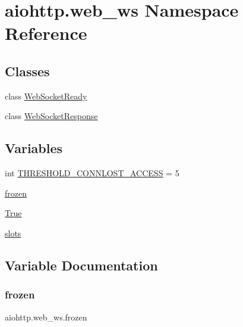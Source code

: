 \hypertarget{namespaceaiohttp_1_1web__ws}{}\section{aiohttp.\+web\+\_\+ws Namespace Reference}
\label{namespaceaiohttp_1_1web__ws}
\subsection*{Classes}
\begin{DoxyCompactItemize}
\item 
class \hyperlink{classaiohttp_1_1web__ws_1_1_web_socket_ready}{Web\+Socket\+Ready}
\item 
class \hyperlink{classaiohttp_1_1web__ws_1_1_web_socket_response}{Web\+Socket\+Response}
\end{DoxyCompactItemize}
\subsection*{Variables}
\begin{DoxyCompactItemize}
\item 
int \hyperlink{namespaceaiohttp_1_1web__ws_a301c60ec5ef2ebeaf60dfb153953cd4a}{T\+H\+R\+E\+S\+H\+O\+L\+D\+\_\+\+C\+O\+N\+N\+L\+O\+S\+T\+\_\+\+A\+C\+C\+E\+SS} = 5
\item 
\hyperlink{namespaceaiohttp_1_1web__ws_af1dc0f64cc8b48d311c7ec0ac25519d3}{frozen}
\item 
\hyperlink{namespaceaiohttp_1_1web__ws_ac7829506fa569276f8dff27ec629271b}{True}
\item 
\hyperlink{namespaceaiohttp_1_1web__ws_a4b877f97011219458cea4d85c1d68d09}{slots}
\end{DoxyCompactItemize}


\subsection{Variable Documentation}
\mbox{\label{namespaceaiohttp_1_1web__ws_af1dc0f64cc8b48d311c7ec0ac25519d3}} 
\subsubsection{\texorpdfstring{frozen}{frozen}}
{\footnotesize\ttfamily aiohttp.\+web\+\_\+ws.\+frozen}

